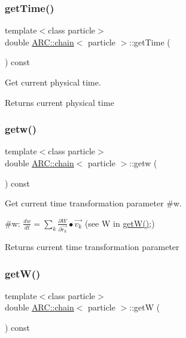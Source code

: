 \subsubsection{\texorpdfstring{get\+Time()}{getTime()}}
{\footnotesize\ttfamily template$<$class particle$>$ \\
double \hyperlink{classARC_1_1chain}{A\+R\+C\+::chain}$<$ particle $>$\+::get\+Time (\begin{DoxyParamCaption}{ }\end{DoxyParamCaption}) const\hspace{0.3cm}{\ttfamily [inline]}}



Get current physical time. 

\begin{DoxyReturn}{Returns}
current physical time 
\end{DoxyReturn}
\hypertarget{classARC_1_1chain_a122985d69620f87c68ae43f4c87e4f00}{}\label{classARC_1_1chain_a122985d69620f87c68ae43f4c87e4f00} 
\subsubsection{\texorpdfstring{getw()}{getw()}}
{\footnotesize\ttfamily template$<$class particle$>$ \\
double \hyperlink{classARC_1_1chain}{A\+R\+C\+::chain}$<$ particle $>$\+::getw (\begin{DoxyParamCaption}{ }\end{DoxyParamCaption}) const\hspace{0.3cm}{\ttfamily [inline]}}



Get current time transformation parameter \#w. 

\#w\+: $ \frac{dw}{dt} = \sum_k \frac{\partial W}{\partial \vec{r_k}} \bullet \vec{v_k} $ (see W in \hyperlink{classARC_1_1chain_a43f7ea8573dcbc4849232c97be26456f}{get\+W()};) \begin{DoxyReturn}{Returns}
current time transformation parameter 
\end{DoxyReturn}
\hypertarget{classARC_1_1chain_a43f7ea8573dcbc4849232c97be26456f}{}\label{classARC_1_1chain_a43f7ea8573dcbc4849232c97be26456f} 
\subsubsection{\texorpdfstring{get\+W()}{getW()}}
{\footnotesize\ttfamily template$<$class particle$>$ \\
double \hyperlink{classARC_1_1chain}{A\+R\+C\+::chain}$<$ particle $>$\+::getW (\begin{DoxyParamCaption}{ }\end{DoxyParamCaption}) const\hspace{0.3cm}{\ttfamily [inline]}}



